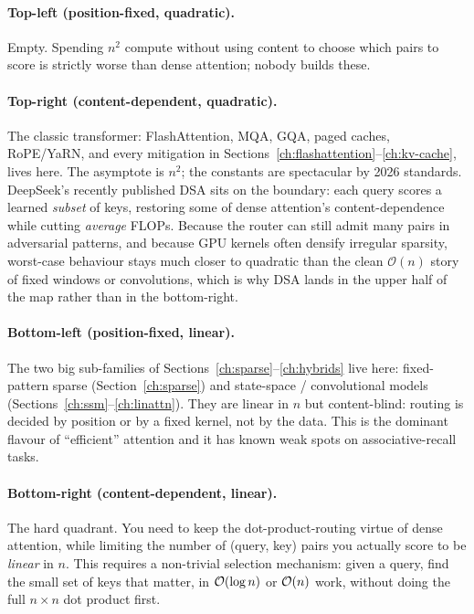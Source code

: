 \paragraph{Top-left (position-fixed, quadratic).} Empty. Spending \(n^2\)
compute without using content to choose which pairs to score is strictly
worse than dense attention; nobody builds these.

\paragraph{Top-right (content-dependent, quadratic).} The classic
transformer: FlashAttention, MQA, GQA, paged caches, RoPE/YaRN, and every
mitigation in Sections~\ref{ch:flashattention}--\ref{ch:kv-cache}, lives here. The asymptote is \(n^2\); the
constants are spectacular by 2026 standards. DeepSeek's recently
published DSA \citep{deepseek2024dsa} sits on the boundary: each query
scores a learned \emph{subset} of keys, restoring some of dense
attention's content-dependence while cutting \emph{average} FLOPs.
Because the router can still admit many pairs in adversarial patterns,
and because GPU kernels often densify irregular sparsity, worst-case
behaviour stays much closer to quadratic than the clean
\(\mathcal{O}(n)\) story of fixed windows or convolutions, which is why
DSA lands in the upper half of the map rather than in the
bottom-right.

\paragraph{Bottom-left (position-fixed, linear).} The two big sub-families
of Sections~\ref{ch:sparse}--\ref{ch:hybrids} live here: fixed-pattern sparse (Section~\ref{ch:sparse}) and
state-space / convolutional models (Sections~\ref{ch:ssm}--\ref{ch:linattn}).
They are linear in \(n\) but content-blind: routing is decided by
position or by a fixed kernel, not by the data. This is the dominant
flavour of ``efficient'' attention and it has known weak spots on
associative-recall tasks.

\paragraph{Bottom-right (content-dependent, linear).} The hard quadrant.
You need to keep the dot-product-routing virtue of dense attention, while
limiting the number of (query, key) pairs you actually score to be
\emph{linear} in \(n\). This requires a non-trivial selection mechanism:
given a query, find the small set of keys that matter, in $\mathcal{O}(\log n)$
or $\mathcal{O}(n)$ work, without doing the full $n \times n$ dot product first.

